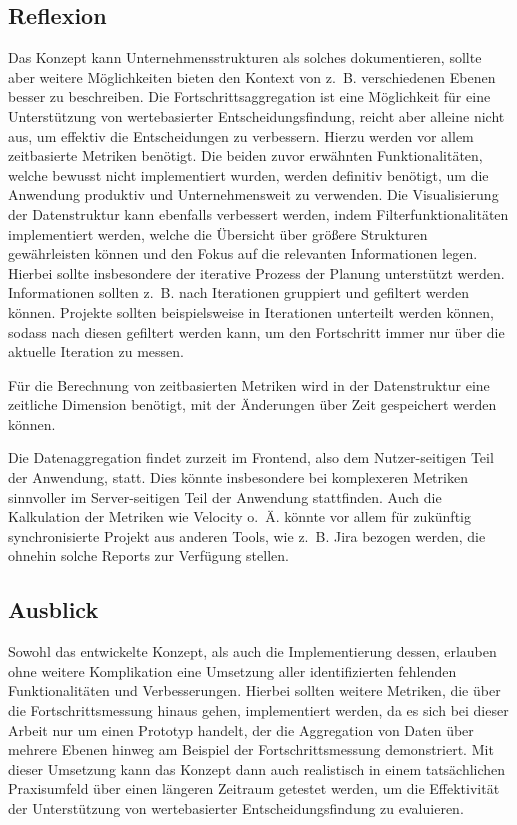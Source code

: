 \subsection{Reflexion}
Das Konzept kann Unternehmensstrukturen als solches dokumentieren, sollte aber weitere Möglichkeiten bieten den Kontext von z. B. verschiedenen Ebenen besser zu beschreiben. Die Fortschrittsaggregation ist eine Möglichkeit für eine Unterstützung von wertebasierter Entscheidungsfindung, reicht aber alleine nicht aus, um effektiv die Entscheidungen zu verbessern. Hierzu werden vor allem zeitbasierte Metriken benötigt. Die beiden zuvor erwähnten Funktionalitäten, welche bewusst nicht implementiert wurden, werden definitiv benötigt, um die Anwendung produktiv und Unternehmensweit zu verwenden. Die Visualisierung der Datenstruktur kann ebenfalls verbessert werden, indem Filterfunktionalitäten implementiert werden, welche die Übersicht über größere Strukturen gewährleisten können und den Fokus auf die relevanten Informationen legen. Hierbei sollte insbesondere der iterative Prozess der Planung unterstützt werden. Informationen sollten z. B. nach Iterationen gruppiert und gefiltert werden können. Projekte sollten beispielsweise in Iterationen unterteilt werden können, sodass nach diesen gefiltert werden kann, um den Fortschritt immer nur über die aktuelle Iteration zu messen.

Für die Berechnung von zeitbasierten Metriken wird in der Datenstruktur eine zeitliche Dimension benötigt, mit der Änderungen über Zeit gespeichert werden können.

Die Datenaggregation findet zurzeit im Frontend, also dem Nutzer-seitigen Teil der Anwendung, statt. Dies könnte insbesondere bei komplexeren Metriken sinnvoller im Server-seitigen Teil der Anwendung stattfinden. Auch die Kalkulation der Metriken wie Velocity o. Ä. könnte vor allem für zukünftig synchronisierte Projekt aus anderen Tools, wie z. B. Jira bezogen werden, die ohnehin solche Reports zur Verfügung stellen.

\subsection{Ausblick}
Sowohl das entwickelte Konzept, als auch die Implementierung dessen, erlauben ohne weitere Komplikation eine Umsetzung aller identifizierten fehlenden Funktionalitäten und Verbesserungen. Hierbei sollten weitere Metriken, die über die Fortschrittsmessung hinaus gehen, implementiert werden, da es sich bei dieser Arbeit nur um einen Prototyp handelt, der die Aggregation von Daten über mehrere Ebenen hinweg am Beispiel der Fortschrittsmessung demonstriert.
Mit dieser Umsetzung kann das Konzept dann auch realistisch in einem tatsächlichen Praxisumfeld über einen längeren Zeitraum getestet werden, um die Effektivität der Unterstützung von wertebasierter Entscheidungsfindung zu evaluieren.
